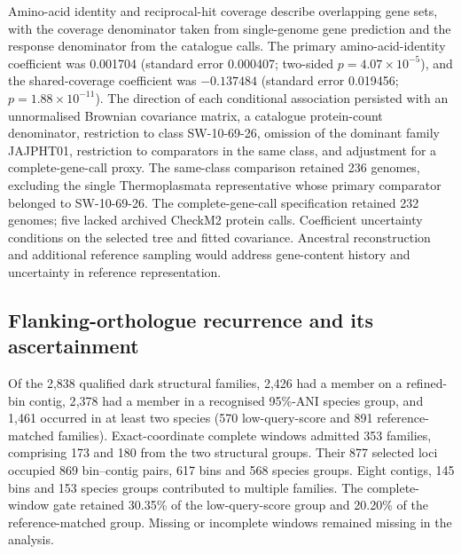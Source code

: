 \documentclass[11pt]{article}
\begin{document}
Amino-acid identity and reciprocal-hit coverage describe overlapping gene sets, with the
coverage denominator taken from single-genome gene prediction and the response denominator
from the catalogue calls. The primary amino-acid-identity coefficient was 0.001704
(standard error 0.000407; two-sided $p=4.07\times10^{-5}$), and the shared-coverage coefficient
was $-0.137484$ (standard error 0.019456; $p=1.88\times10^{-11}$).
The direction of each conditional association persisted with an unnormalised Brownian
covariance matrix, a catalogue protein-count denominator, restriction to class SW-10-69-26,
omission of the dominant family JAJPHT01, restriction to comparators in the same class,
and adjustment for a complete-gene-call proxy. The same-class comparison retained 236 genomes,
excluding the single Thermoplasmata representative whose primary comparator belonged to
SW-10-69-26. The complete-gene-call specification retained 232 genomes;
five lacked archived CheckM2 protein calls. Coefficient uncertainty conditions on the selected
tree and fitted covariance. Ancestral reconstruction and additional reference sampling would
address gene-content history and uncertainty in reference representation.

\subsection*{Flanking-orthologue recurrence and its ascertainment}
Of the 2{,}838 qualified dark structural families, 2{,}426 had a member on a refined-bin contig,
2{,}378 had a member in a recognised 95\%-ANI species group, and 1{,}461 occurred in at least
two species (570 low-query-score and 891 reference-matched families).
Exact-coordinate complete windows admitted 353 families, comprising 173 and 180 from the two
structural groups. Their 877 selected loci occupied 869 bin--contig pairs, 617 bins and 568
species groups. Eight contigs, 145 bins and 153 species groups contributed to multiple families.
The complete-window gate retained 30.35\% of the low-query-score group and 20.20\% of the
reference-matched group. Missing or incomplete windows remained missing in the analysis.
\end{document}
